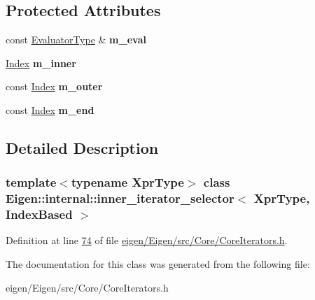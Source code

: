 \subsection*{Protected Attributes}
\begin{DoxyCompactItemize}
\item 
\mbox{\label{class_eigen_1_1internal_1_1inner__iterator__selector_3_01_xpr_type_00_01_index_based_01_4_a7668536ee7bcf87efa777c071a03b3bb}} 
const \hyperlink{struct_eigen_1_1internal_1_1evaluator}{Evaluator\+Type} \& {\bfseries m\+\_\+eval}
\item 
\mbox{\label{class_eigen_1_1internal_1_1inner__iterator__selector_3_01_xpr_type_00_01_index_based_01_4_a84ff8216682727607016682df381d6dd}} 
\hyperlink{namespace_eigen_a62e77e0933482dafde8fe197d9a2cfde}{Index} {\bfseries m\+\_\+inner}
\item 
\mbox{\label{class_eigen_1_1internal_1_1inner__iterator__selector_3_01_xpr_type_00_01_index_based_01_4_a882c0a7787a1b0a6ad0b19e133c20a69}} 
const \hyperlink{namespace_eigen_a62e77e0933482dafde8fe197d9a2cfde}{Index} {\bfseries m\+\_\+outer}
\item 
\mbox{\label{class_eigen_1_1internal_1_1inner__iterator__selector_3_01_xpr_type_00_01_index_based_01_4_ade2963f6fe06b1f2e246d7d6a48c6fb9}} 
const \hyperlink{namespace_eigen_a62e77e0933482dafde8fe197d9a2cfde}{Index} {\bfseries m\+\_\+end}
\end{DoxyCompactItemize}


\subsection{Detailed Description}
\subsubsection*{template$<$typename Xpr\+Type$>$\newline
class Eigen\+::internal\+::inner\+\_\+iterator\+\_\+selector$<$ Xpr\+Type, Index\+Based $>$}



Definition at line \hyperlink{eigen_2_eigen_2src_2_core_2_core_iterators_8h_source_l00074}{74} of file \hyperlink{eigen_2_eigen_2src_2_core_2_core_iterators_8h_source}{eigen/\+Eigen/src/\+Core/\+Core\+Iterators.\+h}.



The documentation for this class was generated from the following file\+:\begin{DoxyCompactItemize}
\item 
eigen/\+Eigen/src/\+Core/\+Core\+Iterators.\+h\end{DoxyCompactItemize}
